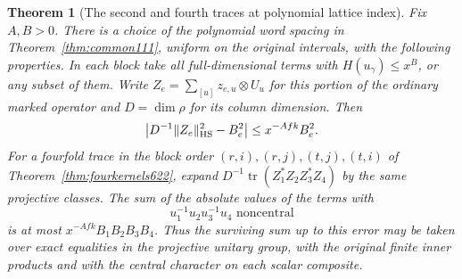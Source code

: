 \documentclass[a4paper,11pt]{article}
\newtheorem{theorem}[proposition]{Theorem}
\theoremstyle{definition}
\theoremstyle{remark}
\numberwithin{equation}{section}
\begin{document}
\begin{theorem}[The second and fourth traces at polynomial lattice index]
\leavevmode\label{thm:centraltraces635}
Fix \(A,B>0\). There is a choice of the polynomial word spacing
in Theorem~\ref{thm:common111}, uniform on the original intervals,
with the following properties. In each block take all full-dimensional
terms with \(H(u_\gamma)\le x^B\), or any subset of them. Write
\(Z_e=\sum_{[u]}z_{e,u}\otimes U_u\) for this portion of the
ordinary marked operator and \(D=\dim\rho\) for its column dimension.
Then
\[
       \left|D^{-1}\|Z_e\|_{\rm HS}^2-B_e^2\right|
                    \le x^{-Afk}B_e^2 .
\]
For a fourfold trace in the block order \((r,i),(r,j),(t,j),(t,i)\)
of Theorem~\ref{thm:fourkernels622}, expand
\(D^{-1}\operatorname{tr}(Z_1^*Z_2 Z_3^*Z_4)\) by the same
projective classes. The sum of the absolute values of the terms with
\[
                     u_1^{-1}u_2u_3^{-1}u_4
                         \text{ noncentral}
\]
is at most \(x^{-Afk} B_1 B_2 B_3 B_4\). Thus the surviving sum
up to this error may be taken over exact equalities in the
projective unitary group, with the original finite inner products
and with the central character on each scalar composite.
\end{theorem}
\end{document}
